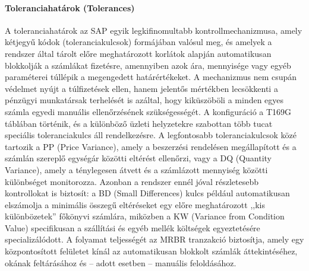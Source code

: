 \paragraph{Toleranciahatárok (Tolerances) \cite{SAP-Tolerance-Keys-Part1, SAP-Tolerance-Keys-Part2}}
A toleranciahatárok az SAP egyik legkifinomultabb kontrollmechanizmusa, amely kétjegyű kódok (toleranciakulcsok) formájában valósul meg, és amelyek a rendszer által tárolt előre meghatározott korlátok alapján automatikusan blokkolják a számlákat fizetésre, amennyiben azok ára, mennyisége vagy egyéb paraméterei túllépik a megengedett határértékeket.
A mechanizmus nem csupán védelmet nyújt a túlfizetések ellen, hanem jelentős mértékben lecsökkenti a pénzügyi munkatársak terhelését is azáltal, hogy kiküszöböli a minden egyes számla egyedi manuális ellenőrzésének szükségességét.
A konfiguráció a T169G táblában történik, és a különböző üzleti helyzetekre szabottan több tucat speciális toleranciakulcs áll rendelkezésre.
A legfontosabb toleranciakulcsok közé tartozik a PP (Price Variance), amely a beszerzési rendelésen megállapított és a számlán szereplő egységár közötti eltérést ellenőrzi, vagy a DQ (Quantity Variance), amely a ténylegesen átvett és a számlázott mennyiség közötti különbséget monitorozza.
Azonban a rendszer ennél jóval részletesebb kontrollokat is biztosít: a BD (Small Differences) kulcs például automatikusan elszámolja a minimális összegű eltéréseket egy előre meghatározott ,,kis különbözetek'' főkönyvi számlára, miközben a KW (Variance from Condition Value) specifikusan a szállítási és egyéb mellék költségek egyeztetésére specializálódott.
A folyamat teljességét az MRBR tranzakció biztosítja, amely egy központosított felületet kínál az automatikusan blokkolt számlák áttekintéséhez, okának feltárásához és – adott esetben – manuális feloldásához.

